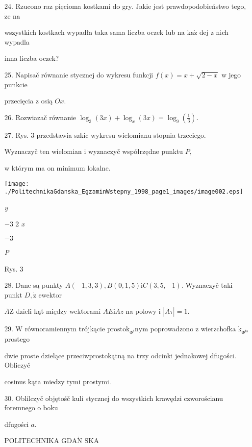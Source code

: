 \documentclass[a4paper,12pt]{article}
\begin{document}
24. Rzucono raz pięcioma kostkami do gry. Jakie jest prawdopodobieństwo tego, $\dot{\mathrm{z}}\mathrm{e}$ na

wszystkich kostkach wypadła taka sama liczba oczek lub na $\mathrm{k}\mathrm{a}\dot{\mathrm{z}}$ dej z nich wypadla

inna liczba oczek?

25. Napisač równanie stycznej do wykresu funkcji $f(x) = x+\sqrt{2-x}$ w jego punkcie

przecięcia z osią $Ox.$

26. Rozwiazač równanie $\displaystyle \log_{3}(3x)+\log_{x}(3x)=\log_{9}(\frac{1}{3}).$

27. Rys. 3 przedstawia szkic wykresu wielomianu stopnia trzeciego.

Wyznaczyč ten wielomian i wyznaczyč współrzędne punktu $P,$

w którym ma on minimum lokalne.
\begin{center}
\texttt{[image: ./PolitechnikaGdanska\_EgzaminWstepny\_1998\_page1\_images/image002.eps]}
\end{center}
{\it y}

$-3$ 2  {\it x}

$-3$

{\it P}

Rys. 3

28. Dane są punkty $A(-1,3,3), B(0,1,5)\mathrm{i}C(3,5,-1)$. Wyznaczyč taki punkt $D, \dot{\mathrm{z}}$ ewektor

$\overline{A}\mathrm{Z}$ dzieli kąt między wektorami $\overline{A}E\mathrm{i}\overline{A}z$ na polowy i $|\overline{A}\tau|=1.$

29. $\mathrm{W}$ równoramiennym trójkącie $\mathrm{p}\mathrm{r}\mathrm{o}\mathrm{s}\mathrm{t}\mathrm{o}\mathrm{k}_{\Phi^{\mathrm{t}}}\mathrm{n}\mathrm{y}\mathrm{m}$ poprowadzono z wierzchofka $\mathrm{k}_{\Phi^{\mathrm{t}\mathrm{a}}}$ prostego

dwie proste dzielące przeciwprostokątną na trzy odcinki jednakowej dfugości. Obliczyč

cosinus kąta miedzy tymi prostymi.

30. Oblilczyč objętośč kuli stycznej do wszystkich krawędzi czworościanu foremnego o boku

dfugości $a.$







POLITECHNIKA $\mathrm{G}\mathrm{D}\mathrm{A}\acute{\mathrm{N}}$ SKA
\end{document}
